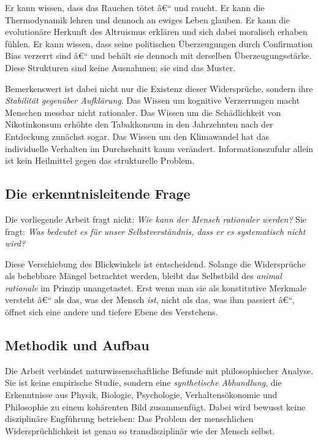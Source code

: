 ﻿\documentclass[12pt, a4paper]{article}
\begin{document}
Er kann wissen, dass das Rauchen tötet â€“ und raucht. Er kann die Thermodynamik
lehren und dennoch an ewiges Leben glauben. Er kann die evolutionäre Herkunft des
Altruismus erklären und sich dabei moralisch erhaben fühlen. Er kann wissen, dass
seine politischen Überzeugungen durch Confirmation Bias verzerrt sind â€“ und behält
sie dennoch mit derselben Überzeugungsstärke. Diese Strukturen sind keine Ausnahmen;
sie sind das Muster.

Bemerkenswert ist dabei nicht nur die Existenz dieser Widersprüche, sondern ihre
\emph{Stabilität gegenüber Aufklärung}. Das Wissen um kognitive Verzerrungen macht
Menschen messbar nicht rationaler. Das Wissen um die Schädlichkeit von
Nikotinkonsum erhöhte den Tabakkonsum in den Jahrzehnten nach der Entdeckung
zunächst sogar. Das Wissen um den Klimawandel hat das individuelle Verhalten im
Durchschnitt kaum verändert. Informationszufuhr allein ist kein Heilmittel gegen
das strukturelle Problem.

\subsection{Die erkenntnisleitende Frage}

Die vorliegende Arbeit fragt nicht: \textit{Wie kann der Mensch rationaler werden?}
Sie fragt: \textit{Was bedeutet es für unser Selbstverständnis, dass er es
systematisch nicht wird?}

Diese Verschiebung des Blickwinkels ist entscheidend. Solange die Widersprüche
als behebbare Mängel betrachtet werden, bleibt das Selbstbild des \textit{animal
rationale} im Prinzip unangetastet. Erst wenn man sie als konstitutive Merkmale
versteht â€“ als das, was der Mensch \emph{ist}, nicht als das, was ihm passiert â€“,
öffnet sich eine andere und tiefere Ebene des Verstehens.

\subsection{Methodik und Aufbau}

Die Arbeit verbindet naturwissenschaftliche Befunde mit philosophischer Analyse.
Sie ist keine empirische Studie, sondern eine \emph{synthetische Abhandlung},
die Erkenntnisse aus Physik, Biologie, Psychologie, Verhaltensökonomie und
Philosophie zu einem kohärenten Bild zusammenfügt. Dabei wird bewusst keine
disziplinäre Engführung betrieben: Das Problem der menschlichen Widersprüchlichkeit
ist genau so transdisziplinär wie der Mensch selbst.
\end{document}

